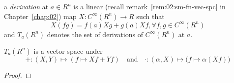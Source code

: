 \begin{defn}
  a \emph{derivation} at $a\in R^n$ is a linear
  (recall remark~\ref{rem:02:sm-fn-vec-spc} in Chapter~\ref{chap:02})
  map $X: C^\infty(R^n)\rightarrow R$ such that
  \[ X(fg)=f(a)Xg+g(a)Xf, \forall f,g\in C^\infty(R^n) \]
  and $T_a(R^n)$ denotes the set of derivations of
  $C^\infty(R^n)$ at $a$.
\end{defn}

\begin{rem}{}
  $T_a(R^n)$ is a vector space under
  \[
  +: (X, Y)\mapsto (f\mapsto Xf + Yf)
  \quad\text{and}\quad
  \cdot: (\alpha, X)\mapsto \big(f\mapsto \alpha(Xf)\big)
  \]
\end{rem}
\begin{proof}
\end{proof}
